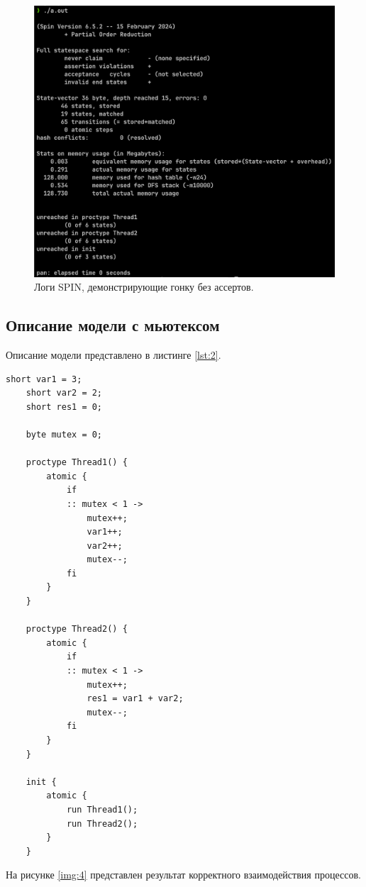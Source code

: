 \begin{figure}[H]
	\centering
	\includegraphics[width=\textwidth]{inc/5.png}
	\caption{ Логи SPIN, демонстрирующие гонку без ассертов. }
	\label{img:5}
\end{figure}

\subsection{Описание модели с мьютексом}

Описание модели представлено в листинге \ref{lst:2}.

\begin{lstlisting}[label=lst:2,caption=Описание модели с мьютексом.]
	short var1 = 3;
	short var2 = 2;
	short res1 = 0;
	
	byte mutex = 0;
	
	proctype Thread1() {
		atomic {
			if
			:: mutex < 1 ->
				mutex++;
				var1++;
				var2++;
				mutex--;
			fi
		}
	}
	
	proctype Thread2() {
		atomic {
			if
			:: mutex < 1 ->
				mutex++;
				res1 = var1 + var2;
				mutex--;
			fi
		}
	}
	
	init {
		atomic {
			run Thread1();
			run Thread2();
		}
	}
\end{lstlisting}

На рисунке \ref{img:4} представлен результат корректного взаимодействия процессов.

